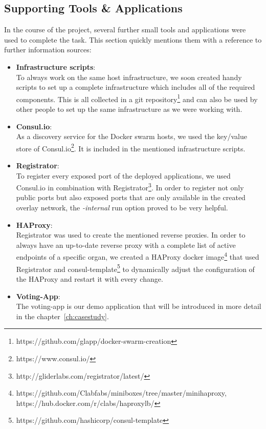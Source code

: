 \documentclass{seal_thesis}
\begin{document}
\subsection{Supporting Tools \& Applications}\label{sec:supportingTools}
In the course of the project, several further small tools and applications were used to complete the task. This section quickly mentions them with a reference to further information sources:
\begin{itemize}
	\item \textbf{Infrastructure scripts}: \\
	To always work on the same host infrastructure, we soon created handy scripts to set up a complete infrastructure which includes all of the required components.
	This is all collected in a git repository\footnote{https://github.com/glapp/docker-swarm-creation} and can also be used by other people to set up the same infrastructure as we were working with.
	\item \textbf{Consul.io}: \\
	As a discovery service for the Docker swarm hosts, we used the key/value store of Consul.io\footnote{https://www.consul.io/}. It is included in the mentioned infrastructure scripts.
	\item \textbf{Registrator}: \\
	To register every exposed port of the deployed applications, we used Consul.io in combination with Registrator\footnote{http://gliderlabs.com/registrator/latest/}. In order to register not only public ports but also exposed ports that are only available in the created overlay network, the \textit{-internal} run option proved to be very helpful. 
	\item \textbf{HAProxy}: \\
	Registrator was used to create the mentioned reverse proxies.
	In order to always have an up-to-date reverse proxy with a complete list of active endpoints of a specific organ, we created a HAProxy docker image\footnote{https://github.com/Clabfabs/miniboxes/tree/master/minihaproxy, https://hub.docker.com/r/clabs/haproxylb/} that used Registrator and consul-template\footnote{https://github.com/hashicorp/consul-template} to dynamically adjust the configuration of the HAProxy and restart it with every change.
	\item \textbf{Voting-App}: \\
	The voting-app is our demo application that will be introduced in more detail in the chapter~\ref{ch:casestudy}.

\end{itemize}
\end{document}
